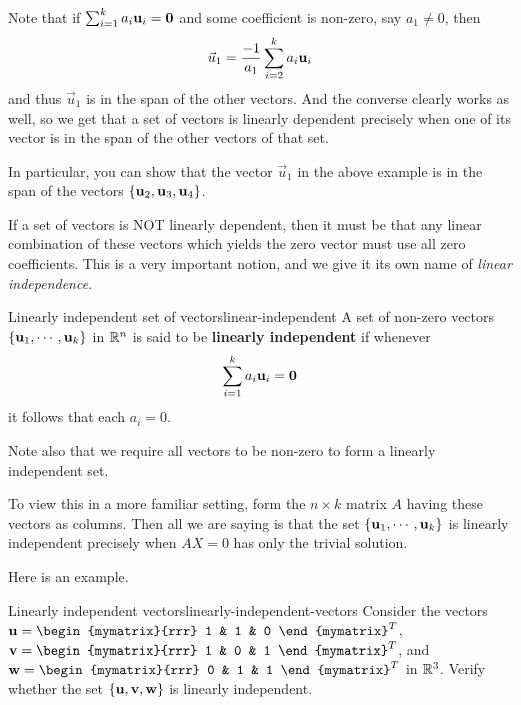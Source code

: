 Note that if $\sum_{i=1}^{k}a_{i}\mbox{\bf u}_{i}=\mbox{\bf 0}$ and some
coefficient is non-zero, say $a_1 \neq 0$, then 
\begin{equation*}
\vec{u}_1 = \frac{-1}{a_1} \sum_{i=2}^{k}a_{i}\mbox{\bf u}_{i} 
\end{equation*}
and thus $\vec{u}_1$ is in the span of the other vectors. And the converse clearly works as well,
so we get that a set of vectors is linearly dependent precisely when
one of its vector is in the span of the other vectors of that set.

In particular, you can show that the vector $\vec{u}_1$ in the above
example is in the span of the vectors  $\{\mbox{\bf u}_2, \mbox{\bf u}_3, \mbox{\bf u}_4\}$. 

If a set of vectors is NOT linearly dependent, then it must be that
any linear combination of these vectors which yields the zero vector
must use all zero coefficients. This is a very important notion, and we give it its own name of {\em
linear independence}. 

\begin{definition}{Linearly independent set of vectors}{linear-independent}
A set of non-zero vectors $\{\mbox{\bf u}_1, \cdots ,\mbox{\bf u}_k\}$ in $\mathbb{R}^{n}$ is said to be 
\textbf{linearly independent} if whenever 
\begin{equation*}
\sum_{i=1}^{k}a_{i}\mbox{\bf u}_{i}=\mbox{\bf 0}
\end{equation*}
it follows that each $a_{i}=0$.
\end{definition}


Note also that we require all vectors to be non-zero to form a
linearly independent set.

To view this in a more familiar setting, form the $n \times k$ matrix
$A$ having these vectors as columns. Then all we are saying is that
the set $\{\mbox{\bf u}_1, \cdots ,\mbox{\bf u}_k\}$ is linearly independent
precisely when $AX=0$ has only the trivial solution.

Here is an example.  

\begin{example}{Linearly independent vectors}{linearly-independent-vectors}
Consider the vectors $\vect{u}=\begin{mymatrix}{rrr}
1  & 1 & 0
\end{mymatrix}^T$, 
$\vect{v}=\begin{mymatrix}{rrr}
1  & 0 & 1
\end{mymatrix}^T$, and
$\vect{w}=\begin{mymatrix}{rrr}
0  & 1 & 1
\end{mymatrix}^T$ in $\mathbb{R}^{3}$.
Verify whether the set $\{\mbox{\bf u}, \mbox{\bf v}, \mbox{\bf w}\}$ is linearly independent. 
\end{example}

